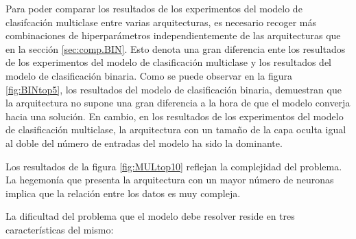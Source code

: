 Para poder comparar los resultados de los experimentos del modelo de clasifcación multiclase entre varias arquitecturas, es necesario recoger más combinaciones de hiperparámetros independientemente de las arquitecturas que en la sección \ref{sec:comp.BIN}. Esto denota una gran diferencia ente los resultados de los experimentos del modelo de clasificación multiclase y los resultados del modelo de clasificación binaria. Como se puede observar en la figura \ref{fig:BINtop5}, los resultados del modelo de clasificación binaria, demuestran que la arquitectura no supone una gran diferencia a la hora de que el modelo converja hacia una solución. En cambio, en los resultados de los experimentos del modelo de clasificación multiclase, la arquitectura con un tamaño de la capa oculta igual al doble del número de entradas del modelo ha sido la dominante.

Los resultados de la figura \ref{fig:MULtop10} reflejan la complejidad del problema. La hegemonía que presenta la arquitectura con un mayor número de neuronas implica que la relación entre los datos es muy compleja. 

La dificultad del problema que el modelo debe resolver reside en tres características del mismo:

